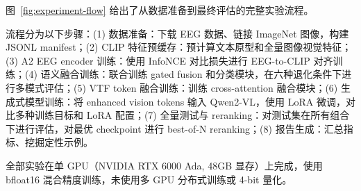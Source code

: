 图~\ref{fig:experiment-flow} 给出了从数据准备到最终评估的完整实验流程。


流程分为以下步骤：(1) 数据准备：下载 EEG 数据、链接 ImageNet 图像，构建 JSONL manifest；(2) CLIP 特征预缓存：预计算文本原型和全量图像视觉特征；(3) A2 EEG encoder 训练：使用 InfoNCE 对比损失进行 EEG-to-CLIP 对齐训练；(4) 语义融合训练：联合训练 gated fusion 和分类模块，在六种退化条件下进行多模式评估；(5) VTF token 融合训练：训练 cross-attention 融合模块；(6) 生成式模型训练：将 enhanced vision tokens 输入 Qwen2-VL，使用 LoRA 微调，对比多种训练目标和 LoRA 配置；(7) 全量测试与 reranking：对测试集在所有组合下进行评估，对最优 checkpoint 进行 best-of-N reranking；(8) 报告生成：汇总指标、挖掘定性示例。

全部实验在单 GPU（NVIDIA RTX 6000 Ada, 48GB 显存）上完成，使用 bfloat16 混合精度训练，未使用多 GPU 分布式训练或 4-bit 量化。

